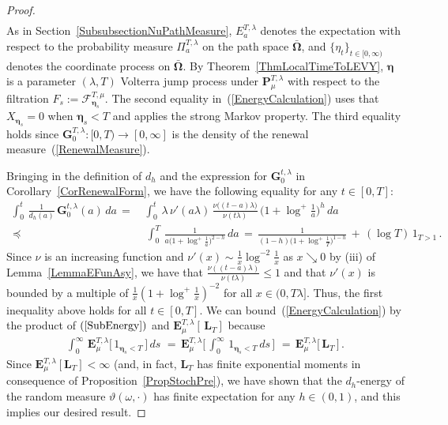 \documentclass[10pt]{article}
\numberwithin{equation}{section}
\theoremstyle{definition}
\begin{document}
\begin{proof}
\begin{align}
\end{align}
As in Section~\ref{SubsubsectionNuPathMeasure}, $E^{T ,\lambda}_a$ denotes the expectation with respect to the probability measure $\Pi^{T,\lambda}_a$ on the path space $\boldsymbol{\bar{\Omega}}$, and $\{\eta_t\}_{t\in [0,\infty)} $ denotes the coordinate  process on $\boldsymbol{\bar{\Omega}}$. By Theorem~\ref{ThmLocalTimeToLEVY}, $\boldsymbol{\eta}$ is a parameter $(\lambda,T) $ Volterra jump process under $\mathbf{P}_{\mu}^{T,\lambda}$    with respect to the filtration $F_s:=\mathscr{F}_{\boldsymbol{\eta}_s}^{T,\mu} $.  The second equality in~(\ref{EnergyCalculation}) uses that  $X_{\boldsymbol{\eta}_s}=0$ when $\boldsymbol{\eta}_s<T$ and  applies the strong Markov property. The third equality holds since  $\mathbf{G}^{T, \lambda }_0:[0,T)\rightarrow [0,\infty] $ is the density of the renewal measure~(\ref{RenewalMeasure}).

Bringing in the definition of $d_{h}$ and the expression for $\mathbf{G}^{t,\lambda}_0$ in Corollary~\ref{CorRenewalForm},   we have the following equality for any $t\in [0,T]$:
\begin{align}\label{SubEnergy}
    \int_{0}^{t}\,\frac{1}{d_{h}(a)} \, \mathbf{G}^{t,\lambda}_0(a)\,da \,=\,&  \int_{0}^{t}\,\lambda\,\nu'(a\lambda)\,\frac{ \nu\big((t-a)\lambda\big)  }{ \nu(t\lambda)   }  \,\Big(1+\log^+\frac{1}{a}    \Big)^h \, da \nonumber  \\
     \,\preceq \,& \,\int_{0}^{T}\,\frac{1}{a\big(1+\log^+ \frac{1}{a}  \big)^{2-h}  }\,da\,= \,\frac{ 1 }{(1-h)\big(1+\log^+\frac{1}{T} \big)^{1-h}  }\,+\,(\log T)\,1_{T>1}\,.
\end{align}
Since $\nu$ is an increasing function and $\nu'(x)\sim \frac{1}{x}\log^{-2}\frac{1}{x}   $ as $x\searrow 0$ by (iii) of Lemma~\ref{LemmaEFunAsy}, we have that $ \frac{ \nu((t-a)\lambda)  }{ \nu(t\lambda)   } \leq 1 $  and that $\nu'(x)$ is bounded by a multiple of $\frac{1}{x }(1+\log^+ \frac{1}{x}  )^{-2} $ for all $x\in (0,T\lambda]$.  Thus, the first inequality above holds for all $t\in [0,T]$.  We can bound~(\ref{EnergyCalculation}) by the product of $(\ref{SubEnergy}) $ and $ \mathbf{E}_{\mu}^{T,\lambda}[\, \mathbf{L}_T]$ because
\begin{align*}
 \int_{0}^{\infty}\,\mathbf{E}_{\mu}^{T,\lambda}\big[\, 1_{\boldsymbol{\eta}_s < T } \, \big]\,ds  \,  
 \,=\, \mathbf{E}_{\mu}^{T,\lambda}\bigg[\,\int_{0}^{\infty}\, 1_{\boldsymbol{\eta}_s < T }\, ds\, \bigg]  \,  
 \,=\,  \mathbf{E}_{\mu}^{T,\lambda}\big[\, \mathbf{L}_T\,\big] \,.
\end{align*}
Since $\mathbf{E}_{\mu}^{T,\lambda}[ \mathbf{L}_T ]  <\infty$ (and, in fact, $\mathbf{L}_T $ has finite exponential moments in consequence of Proposition~\ref{PropStochPre}), we have shown that the  $d_h$-energy of the random measure $\vartheta(\omega,\cdot)$ has finite expectation for any $h\in (0,1)$, and this implies our desired result. 
\end{proof}
\end{document}
